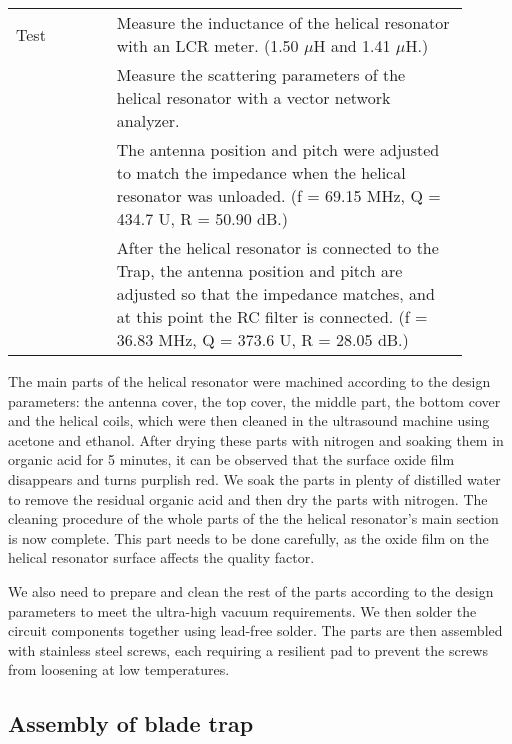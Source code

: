 \begin{table}
\begin{tabular}{p{0.2\linewidth}p{0.7\linewidth}}
        Test         & Measure the inductance of the helical resonator with an LCR meter. (1.50 $\mu$H and 1.41 $\mu $H.)                                                                                                                         \\
                     & Measure the scattering parameters of the helical resonator with a vector network analyzer.                                                                                                                                 \\
                     & The antenna position and pitch were adjusted to match the impedance when the helical resonator was unloaded. (f = 69.15 MHz, Q = 434.7 U, R = 50.90 dB.)                                                                   \\
                     & After the helical resonator is connected to the Trap, the antenna position and pitch are adjusted so that the impedance matches, and at this point the RC filter is connected. (f = 36.83 MHz, Q = 373.6 U, R = 28.05 dB.) \\
        \bottomrule
    \end{tabular}
\end{table}

The main parts of the helical resonator were machined according to the design parameters: the antenna cover, the top cover, the middle part, the bottom cover and the helical coils, which were then cleaned in the ultrasound machine using acetone and ethanol. After drying these parts with nitrogen and soaking them in organic acid for 5 minutes, it can be observed that the surface oxide film disappears and turns purplish red. We soak the parts in plenty of distilled water to remove the residual organic acid and then dry the parts with nitrogen. The cleaning procedure of the whole parts of the the helical resonator's main section is now complete. This part needs to be done carefully, as the oxide film on the helical resonator surface affects the quality factor.

We also need to prepare and clean the rest of the parts according to the design parameters to meet the ultra-high vacuum requirements. We then solder the circuit components together using lead-free solder. The parts are then assembled with stainless steel screws, each requiring a resilient pad to prevent the screws from loosening at low temperatures.


\subsection{Assembly of blade trap}

